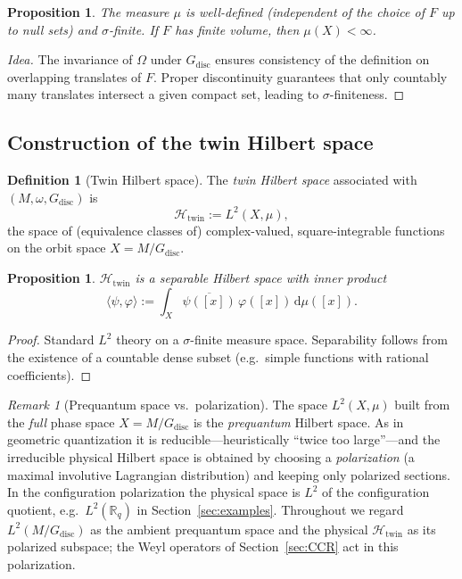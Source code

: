 \documentclass[11pt]{article}
\numberwithin{equation}{section}
\newtheorem{proposition}[theorem]{Proposition}
\theoremstyle{definition}
\newtheorem{definition}[theorem]{Definition}
\theoremstyle{remark}
\newtheorem{remark}[theorem]{Remark}
\newcommand{\R}{\mathbb{R}}
\newcommand{\dd}{\mathrm{d}}
\newcommand{\Htw}{\mathcal{H}_{\mathrm{twin}}}
\newcommand{\Gdisc}{G_{\mathrm{disc}}}
\begin{document}
	\begin{proposition}
		The measure $\mu$ is well-defined (independent of the choice of $F$ up
		to null sets) and $\sigma$-finite. If $F$ has finite volume, then
		$\mu(X)<\infty$.
	\end{proposition}
	
	\begin{proof}[Idea]
		The invariance of $\Omega$ under $\Gdisc$ ensures consistency of the
		definition on overlapping translates of $F$. Proper discontinuity
		guarantees that only countably many translates intersect a given compact
		set, leading to $\sigma$-finiteness.
	\end{proof}
	
	
	\subsection{Construction of the twin Hilbert space}
	
	\begin{definition}[Twin Hilbert space]
		The \emph{twin Hilbert space} associated with $(M,\omega,\Gdisc)$ is
		\[
		\Htw := L^2(X,\mu),
		\]
		the space of (equivalence classes of) complex-valued, square-integrable
		functions on the orbit space $X=M/\Gdisc$.
	\end{definition}
	
	\begin{proposition}
		$\Htw$ is a separable Hilbert space with inner product
		\[
		\langle \psi,\varphi\rangle
		:= \int_X \overline{\psi([x])}\,\varphi([x])\,\dd\mu([x]).
		\]
	\end{proposition}
	
	\begin{proof}
		Standard $L^2$ theory on a $\sigma$-finite measure space.
		Separability follows from the existence of a countable dense subset
		(e.g.\ simple functions with rational coefficients).
	\end{proof}
	
	\begin{remark}[Prequantum space vs.\ polarization]\label{rem:polarization}
		The space $L^2(X,\mu)$ built from the \emph{full} phase space
		$X=M/\Gdisc$ is the \emph{prequantum} Hilbert space. As in geometric
		quantization it is reducible---heuristically ``twice too large''---and
		the irreducible physical Hilbert space is obtained by choosing a
		\emph{polarization} (a maximal involutive Lagrangian distribution) and
		keeping only polarized sections. In the configuration polarization the
		physical space is $L^2$ of the configuration quotient, e.g.\
		$L^2(\R_q)$ in Section~\ref{sec:examples}. Throughout we regard
		$L^2(M/\Gdisc)$ as the ambient prequantum space and the physical
		$\Htw$ as its polarized subspace; the Weyl operators of
		Section~\ref{sec:CCR} act in this polarization.
	\end{remark}
	
\end{document}
